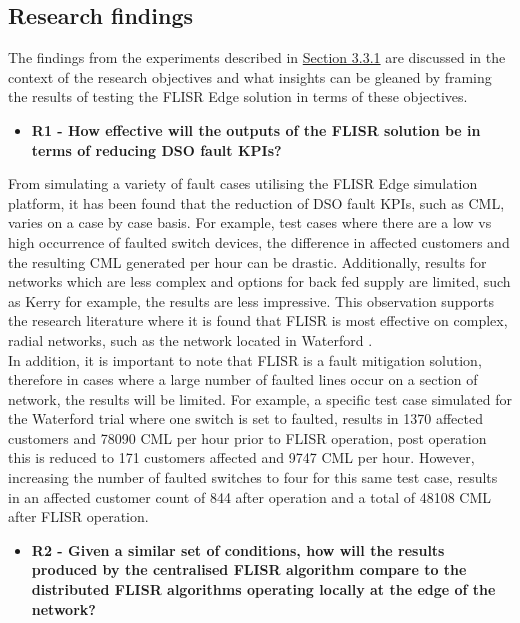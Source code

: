 \subsection{Research findings}
\label{sec:findings}

The findings from the experiments described in \hyperref[sec:simulation_platform]{Section 3.3.1} are discussed in the context of the research objectives and what
insights can be gleaned by framing the results of testing the FLISR Edge solution in terms of these objectives.

\begin{itemize}
  \item \textbf{R1 - How effective will the outputs of the FLISR solution be in terms of reducing DSO fault KPIs?}
\end{itemize}

\noindent From simulating a variety of fault cases utilising the FLISR Edge simulation platform, it has been found that the reduction of DSO fault KPIs, such as CML, varies on a case by
case basis. For example, test cases where there are a low vs high occurrence of faulted switch devices, the difference in affected customers and the resulting CML generated per hour can be drastic.
Additionally, results for networks which are less complex and options for back fed supply are limited, such as Kerry for example, the results are less impressive.
This observation supports the research literature where it is found that FLISR is most effective on complex, radial networks, such as the network located in Waterford \cite{7000578}.
\\
In addition, it is important to note that FLISR is a fault mitigation solution, therefore in cases where a large number of faulted lines occur on a section of network, the results will be
limited. For example, a specific test case simulated for the Waterford trial where one switch is set to faulted, results in 1370 affected customers and 78090 CML per hour prior to FLISR operation,
post operation this is reduced to 171 customers affected and 9747 CML per hour. However, increasing the number of faulted switches to four for this same test case,
results in an affected customer count of 844 after operation and a total of 48108 CML after FLISR operation.

\begin{itemize}
  \item \textbf{R2 - Given a similar set of conditions, how will the results produced by the centralised FLISR algorithm compare to the distributed FLISR algorithms operating locally at the edge of the network?}
\end{itemize}

